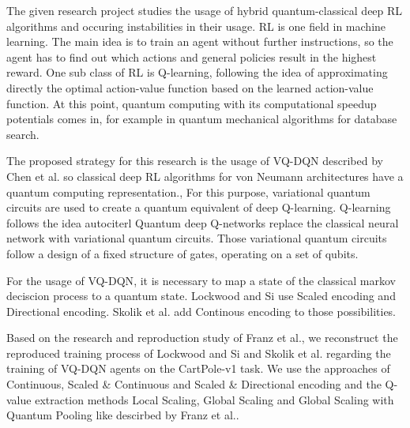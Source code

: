 The given research project studies the usage of hybrid quantum-classical deep \ac{RL} algorithms and occuring instabilities in their usage.
\ac{RL} is one field in machine learning.
The main idea is to train an agent without further instructions, so the agent has to find out which actions and general policies result in the highest reward.
One sub class of \ac{RL} is Q-learning, following the idea of approximating directly the optimal action-value function based on the learned action-value function.\autocite{rl}
At this point, quantum computing with its computational speedup potentials comes in, for example in quantum mechanical algorithms for database search\autocite{databasesearch}. 



The proposed strategy for this research is the usage of \ac{VQ-DQN} described by Chen et al. so classical deep \ac{RL} algorithms for von Neumann architectures have a quantum computing representation.\autocite{vqdqn},
For this purpose, variational quantum circuits are used to create a quantum equivalent of deep Q-learning.
Q-learning follows the idea autocite{rl}
Quantum deep Q-networks replace the classical neural network with variational quantum circuits.
Those variational quantum circuits follow a design of a fixed structure of gates, operating on a set of qubits.\autocite{circuits}


For the usage of \ac{VQ-DQN}, it is necessary to map a state of the classical markov deciscion process to a quantum state. 
Lockwood and Si use Scaled encoding and Directional encoding.\autocite{lockwood}
Skolik et al. add Continous encoding to those possibilities.\autocite{skolik}


Based on the research and reproduction study of Franz et al.\autocite{instabilities}, we reconstruct the reproduced training process of Lockwood and Si\autocite{lockwood} and Skolik et al.\autocite{skolik} regarding the training of \ac{VQ-DQN} agents on the CartPole-v1 task. 
We use the approaches of Continuous, Scaled \& Continuous and Scaled \& Directional encoding and the Q-value extraction methods Local Scaling, Global Scaling and Global Scaling with Quantum Pooling like descirbed by Franz et al.\autocite{instabilities}.
